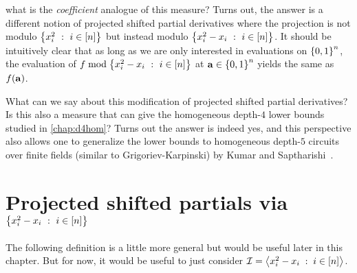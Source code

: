 
\noindent
what is the \emph{coefficient} analogue of this measure?
Turns out, the answer is a different notion of projected shifted partial derivatives where the projection is not modulo $\left\{{x_i^2}\ : \ {i\in [n]}\right\}$ but instead modulo $\left\{{x_i^2 - x_i}\ : \ {i\in [n]}\right\}$.
It should be intuitively clear that as long as we are only interested in evaluations on $\left\{0,1\right\}^n$, the evaluation of  $f \bmod \left\{{x_i^2 - x_i}\ : \ {i\in [n]}\right\}$ at $\mathbf{a}\in \left\{0,1\right\}^n$ yields the same  as $f(\mathbf{a})$. 

What can we say about this modification of projected shifted partial derivatives? Is this also a measure that can give the homogeneous depth-$4$ lower bounds studied in \autoref{chap:d4hom}? Turns out the answer is indeed yes, and this perspective also allows one to generalize the lower bounds to homogeneous depth-$5$ circuits over finite fields (similar to Grigoriev-Karpinski) by Kumar and Saptharishi~\cite{KumarSapt15}. 

\section{Projected shifted partials via $\left\{{x_i^2-x_i}\ : \ {i\in [n]}\right\}$}

The following definition is a little more general but would be useful later in this chapter. But for now, it would be useful to just consider $\mathcal{I} = \left\langle x_i^2 - x_i \;:\; i\in [n]\right\rangle$. 


